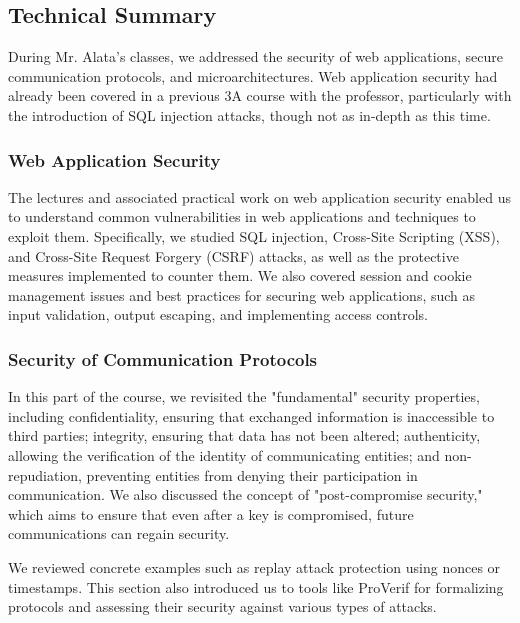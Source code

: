 \subsection{Technical Summary}
\indent \indent During Mr. Alata's classes, we addressed the security of web applications, secure communication protocols, and microarchitectures. Web application security had already been covered in a previous 3A course with the professor, particularly with the introduction of SQL injection attacks, though not as in-depth as this time.

\subsubsection{Web Application Security}
\indent \indent The lectures and associated practical work on web application security enabled us to understand common vulnerabilities in web applications and techniques to exploit them. Specifically, we studied SQL injection, Cross-Site Scripting (XSS), and Cross-Site Request Forgery (CSRF) attacks, as well as the protective measures implemented to counter them. We also covered session and cookie management issues and best practices for securing web applications, such as input validation, output escaping, and implementing access controls.

\subsubsection{Security of Communication Protocols}
\indent \indent In this part of the course, we revisited the "fundamental" security properties, including confidentiality, ensuring that exchanged information is inaccessible to third parties; integrity, ensuring that data has not been altered; authenticity, allowing the verification of the identity of communicating entities; and non-repudiation, preventing entities from denying their participation in communication. We also discussed the concept of "post-compromise security," which aims to ensure that even after a key is compromised, future communications can regain security.

\noindent We reviewed concrete examples such as replay attack protection using nonces or timestamps. This section also introduced us to tools like ProVerif for formalizing protocols and assessing their security against various types of attacks.

